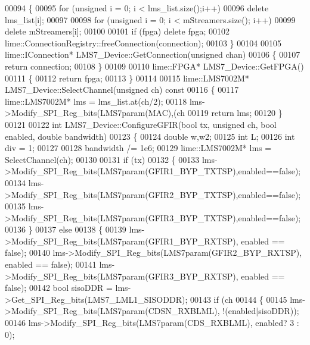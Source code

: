 \begin{DoxyCode}
00094 \{
00095     \textcolor{keywordflow}{for} (\textcolor{keywordtype}{unsigned} i = 0; i < lms_list.size();i++)
00096         \textcolor{keyword}{delete} lms_list[i];
00097 
00098     \textcolor{keywordflow}{for} (\textcolor{keywordtype}{unsigned} i = 0; i < mStreamers.size(); i++)
00099         \textcolor{keyword}{delete} mStreamers[i];
00100 
00101     \textcolor{keywordflow}{if} (fpga) \textcolor{keyword}{delete} fpga;
00102     lime::ConnectionRegistry::freeConnection(connection);
00103 \}
00104 
00105 lime::IConnection* LMS7_Device::GetConnection(\textcolor{keywordtype}{unsigned} chan)
00106 \{
00107     \textcolor{keywordflow}{return} connection;
00108 \}
00109 
00110 lime::FPGA* LMS7_Device::GetFPGA()
00111 \{
00112     \textcolor{keywordflow}{return} fpga;
00113 \}
00114 
00115 lime::LMS7002M* LMS7_Device::SelectChannel(\textcolor{keywordtype}{unsigned} ch)\textcolor{keyword}{ const}
00116 \textcolor{keyword}{}\{
00117     lime::LMS7002M* lms = lms_list.at(ch/2);
00118     lms->Modify_SPI_Reg_bits(LMS7param(MAC),(ch%
00119     \textcolor{keywordflow}{return} lms;
00120 \}
00121 
00122 \textcolor{keywordtype}{int} LMS7_Device::ConfigureGFIR(\textcolor{keywordtype}{bool} tx, \textcolor{keywordtype}{unsigned} ch, \textcolor{keywordtype}{bool} enabled, \textcolor{keywordtype}{double} 
      bandwidth)
00123 \{
00124     \textcolor{keywordtype}{double} w,w2;
00125     \textcolor{keywordtype}{int} L;
00126     \textcolor{keywordtype}{int} div = 1;
00127 
00128     bandwidth /= 1e6;
00129     lime::LMS7002M* lms = SelectChannel(ch);
00130 
00131     \textcolor{keywordflow}{if} (tx)
00132     \{
00133         lms->Modify_SPI_Reg_bits(LMS7param(GFIR1_BYP_TXTSP),enabled==\textcolor{keyword}{false});
00134         lms->Modify_SPI_Reg_bits(LMS7param(GFIR2_BYP_TXTSP),enabled==\textcolor{keyword}{false});
00135         lms->Modify_SPI_Reg_bits(LMS7param(GFIR3_BYP_TXTSP),enabled==\textcolor{keyword}{false});
00136     \}
00137     \textcolor{keywordflow}{else}
00138     \{
00139         lms->Modify_SPI_Reg_bits(LMS7param(GFIR1_BYP_RXTSP), enabled == \textcolor{keyword}{false});
00140         lms->Modify_SPI_Reg_bits(LMS7param(GFIR2_BYP_RXTSP), enabled == \textcolor{keyword}{false});
00141         lms->Modify_SPI_Reg_bits(LMS7param(GFIR3_BYP_RXTSP), enabled == \textcolor{keyword}{false});
00142         \textcolor{keywordtype}{bool} sisoDDR = lms->Get_SPI_Reg_bits(LMS7_LML1_SISODDR);
00143         \textcolor{keywordflow}{if} (ch%
00144         \{
00145             lms->Modify_SPI_Reg_bits(LMS7param(CDSN_RXBLML), !(enabled|sisoDDR));
00146             lms->Modify_SPI_Reg_bits(LMS7param(CDS_RXBLML), enabled? 3 : 0);

\end{DoxyCode}
